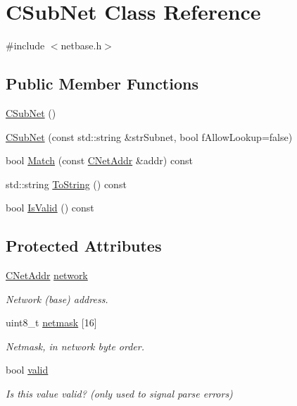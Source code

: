 \hypertarget{class_c_sub_net}{}\section{C\+Sub\+Net Class Reference}
\label{class_c_sub_net}


{\ttfamily \#include $<$netbase.\+h$>$}

\subsection*{Public Member Functions}
\begin{DoxyCompactItemize}
\item 
\mbox{\hyperlink{class_c_sub_net_ae3a0b1dcca899c93ab7000b51f7f4668}{C\+Sub\+Net}} ()
\item 
\mbox{\hyperlink{class_c_sub_net_a6e8cd7a5e46e93d3ad62896dcb5a5a78}{C\+Sub\+Net}} (const std\+::string \&str\+Subnet, bool f\+Allow\+Lookup=false)
\item 
bool \mbox{\hyperlink{class_c_sub_net_af84fa02ebca222739c55e9d2cd7d38a3}{Match}} (const \mbox{\hyperlink{class_c_net_addr}{C\+Net\+Addr}} \&addr) const
\item 
std\+::string \mbox{\hyperlink{class_c_sub_net_a91cabfec6c5056fe8f8b477334563880}{To\+String}} () const
\item 
bool \mbox{\hyperlink{class_c_sub_net_abe05f70043af710ac075a4dd77757394}{Is\+Valid}} () const
\end{DoxyCompactItemize}
\subsection*{Protected Attributes}
\begin{DoxyCompactItemize}
\item 
\mbox{\hyperlink{class_c_net_addr}{C\+Net\+Addr}} \mbox{\hyperlink{class_c_sub_net_a17c8e899bfed76a371c833fb4cd679c9}{network}}
\begin{DoxyCompactList}\small\item\em Network (base) address. \end{DoxyCompactList}\item 
uint8\+\_\+t \mbox{\hyperlink{class_c_sub_net_a7ba6fc57a4ddcddfa3f3355cc3e56adc}{netmask}} \mbox{[}16\mbox{]}
\begin{DoxyCompactList}\small\item\em Netmask, in network byte order. \end{DoxyCompactList}\item 
bool \mbox{\hyperlink{class_c_sub_net_a01fbc9843041de802baeaf4d6e4bbcc5}{valid}}
\begin{DoxyCompactList}\small\item\em Is this value valid? (only used to signal parse errors) \end{DoxyCompactList}\end{DoxyCompactItemize}
